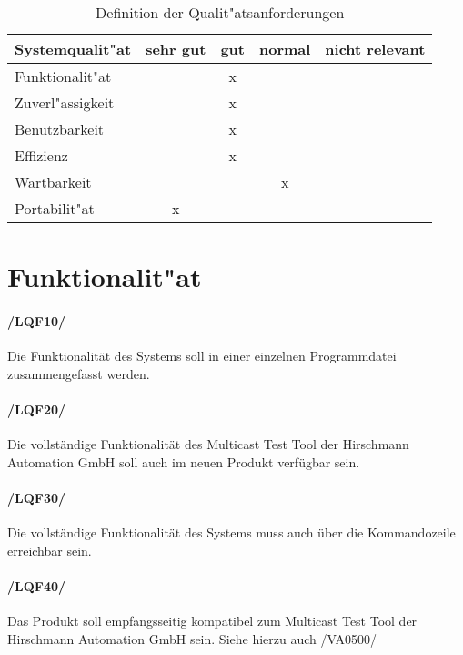 \begin{table}[htdp]
\caption{Definition der Qualit"atsanforderungen}
\label{tab:quality}
\begin{center}
\begin{tabular}{|l|c|c|c|c|}
\hline
\textbf{Systemqualit"at} & \textbf{sehr gut} & \textbf{gut} & \textbf{normal} & \textbf{nicht relevant} \\
\hline
Funktionalit"at & & x & & \\
\hline
Zuverl"assigkeit & & x & & \\
\hline
Benutzbarkeit & & x & & \\
\hline
Effizienz & & x & & \\
\hline
Wartbarkeit & & & x & \\
\hline
Portabilit"at & x & & &  \\
\hline
\end{tabular}
\end{center}
\label{default}
\end{table}

\section{Funktionalit"at}

\paragraph{/LQF10/} Die Funktionalität des Systems soll in einer einzelnen
Programmdatei zusammengefasst werden.

\paragraph{/LQF20/} Die vollständige Funktionalität des
Multicast Test Tool der Hirschmann Automation GmbH soll auch im neuen
Produkt verfügbar sein.

\paragraph{/LQF30/} Die vollständige Funktionalität des Systems muss auch über
die Kommandozeile erreichbar sein.

\paragraph{/LQF40/} Das Produkt soll empfangsseitig kompatibel zum
Multicast Test Tool der Hirschmann Automation GmbH sein. Siehe hierzu auch /VA0500/
 
